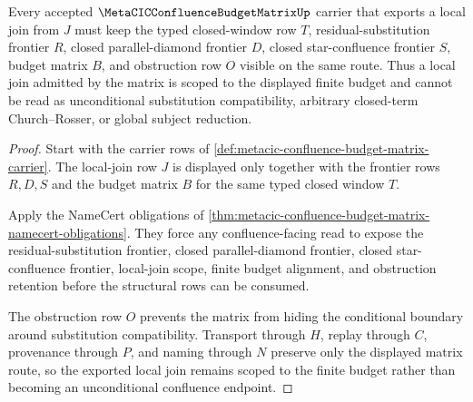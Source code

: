 \begin{theorem}
\label{thm:metacic-confluence-budget-matrix-local-join-scope}
Every accepted $\MetaCICConfluenceBudgetMatrixUp$ carrier that exports a local join from $J$ must keep the typed closed-window row $T$, residual-substitution frontier $R$, closed parallel-diamond frontier $D$, closed star-confluence frontier $S$, budget matrix $B$, and obstruction row $O$ visible on the same route. Thus a local join admitted by the matrix is scoped to the displayed finite budget and cannot be read as unconditional substitution compatibility, arbitrary closed-term Church--Rosser, or global subject reduction.
\end{theorem}
\begin{proof}
Start with the carrier rows of \autoref{def:metacic-confluence-budget-matrix-carrier}. The local-join row $J$ is displayed only together with the frontier rows $R,D,S$ and the budget matrix $B$ for the same typed closed window $T$.

Apply the NameCert obligations of \autoref{thm:metacic-confluence-budget-matrix-namecert-obligations}. They force any confluence-facing read to expose the residual-substitution frontier, closed parallel-diamond frontier, closed star-confluence frontier, local-join scope, finite budget alignment, and obstruction retention before the structural rows can be consumed.

The obstruction row $O$ prevents the matrix from hiding the conditional boundary around substitution compatibility. Transport through $H$, replay through $C$, provenance through $P$, and naming through $N$ preserve only the displayed matrix route, so the exported local join remains scoped to the finite budget rather than becoming an unconditional confluence endpoint.
\end{proof}



